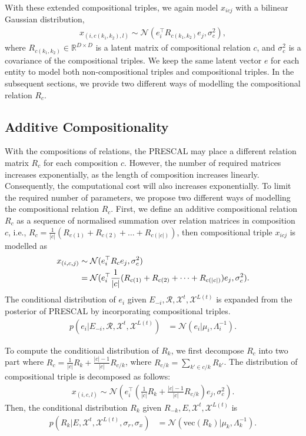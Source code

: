 With these extended compositional triples, we again model $x_{icj}$ with a bilinear Gaussian distribution,
\begin{align}
x_{(i, {{c}(k_1, k_2)}, l)} \sim \mathcal{N}(e_i^\top R_{{c}(k_1,k_2)} e_j, \sigma_{c}^2),
\end{align}
where $R_{{c}(k_1,k_2)} \in \mathbb{R}^{D\times D}$ is a latent matrix of compositional relation $c$, and $
\sigma_{c}^2$ is a covariance of the compositional triples. We keep the same latent vector $e$ for each entity
to model both non-compositional triples and compositional triples.
In the subsequent sections, we provide two different ways of modelling the compositional relation $R_c$.

\subsection{Additive Compositionality}
With the compositions of relations, the PRESCAL may place a different relation matrix $R_c$ for each composition $c$. However, the number of required matrices increases exponentially, as the length of composition increases linearly. Consequently, the computational cost will also increases exponentially.
To limit the required number of parameters, we propose two different ways of modelling the compositional relation $R_c$.
First, we define an additive compositional relation $R_c$ as a sequence of normalised summation over
relation matrices in composition $c$, i.e.,
$R_{{c}} = \frac{1}{|c|}(R_{c(1)} + R_{c(2)} + \dots + R_{c(|c|)})$, then compositional triple $x_{icj}$
is modelled as
\begin{align}
x_{(i, c, j)} &\sim \mathcal{N}(e_i^\top R_c e_j, \sigma_{c}^2) \\
&= \mathcal{N}(e_i^\top \frac{1}{|c|}(R_{c(1)} + R_{c(2)} + \dots + R_{c(|c|)}) e_j, \sigma_{c}^2). \notag
\end{align}
The conditional distribution of $e_i$ given $E_{-i}, \mathcal{R}, \mathcal{X}^{t}, \mathcal{X}^{L(t)}$ is
expanded from the posterior of PRESCAL by incorporating compositional triples.
\begin{align} \label{eqn:comp_sample_e}
p(e_i |E_{-i}, \mathcal{R}, \mathcal{X}^{t}, \mathcal{X}^{L(t)}) &= \mathcal{N}(e_i | \mu_i, \Lambda_i^{-1}).
\end{align}

To compute the conditional distribution of $R_k$, we first decompose $R_c$ into two part where $R_c =
\frac{1}{|c|} R_k + \frac{|c|-1}{|c|}R_{c/k}$, where $R_{c/k} = \sum_{k' \in c/k} R_{k'}$.
The distribution of compositional triple is decomposed as follows:
\begin{align}
x_{(i, c, l)} \sim \mathcal{N}(e_i^\top (\frac{1}{|c|} R_k + \frac{|c|-1}{|c|}R_{c/k}) e_j, \sigma_{c}^2).
\end{align}
Then, the conditional distribution $R_k$ given $R_{-k}, E, \mathcal{X}^{t}, \mathcal{X}^{L(t)}$ is
\begin{align}
\label{eqn:comp_cond_r}
p(R_k|E, \mathcal{X}^{t}, \mathcal{X}^{L(t)}, \sigma_r, \sigma_x)  &= \mathcal{N}(\text{vec}(R_k) | \mu_k,
\Lambda_k^{-1}).
\end{align}

